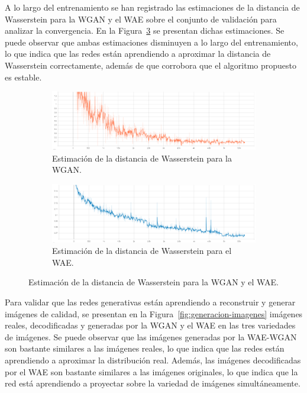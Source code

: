 A lo largo del entrenamiento se han registrado las estimaciones de la distancia de Wasserstein para la WGAN y el WAE sobre el conjunto de validación para analizar la convergencia. En la Figura~\ref{fig:wass-dist} se presentan dichas estimaciones. Se puede observar que ambas estimaciones disminuyen a lo largo del entrenamiento, lo que indica que las redes están aprendiendo a aproximar la distancia de Wasserstein correctamente, además de que corrobora que el algoritmo propuesto es estable.

\begin{figure}[H]
    \begin{subfigure}[b]{0.8\textwidth}
        \centering
        \includegraphics[width=\textwidth]{img/wgan-wae/wass-dist-wgan.png}
        \caption{Estimación de la distancia de Wasserstein para la WGAN.}
        \label{fig:wass-dist-wgan}
    \end{subfigure}
    \begin{subfigure}[b]{0.8\textwidth}
        \centering
        \includegraphics[width=\textwidth]{img/wgan-wae/wass-dist-wae.png}
        \caption{Estimación de la distancia de Wasserstein para el WAE.}
        \label{fig:wass-dist-wae}
    \end{subfigure}
    \caption{Estimación de la distancia de Wasserstein para la WGAN y el WAE.}
    \label{fig:wass-dist}
\end{figure}

Para validar que las redes generativas están aprendiendo a reconstruir y generar imágenes de calidad, se presentan en la Figura~\ref{fig:generacion-imagenes} imágenes reales, decodificadas y generadas por la WGAN y el WAE en las tres variedades de imágenes. Se puede observar que las imágenes generadas por la WAE-WGAN son bastante similares a las imágenes reales, lo que indica que las redes están aprendiendo a aproximar la distribución real. Además, las imágenes decodificadas por el WAE son bastante similares a las imágenes originales, lo que indica que la red está aprendiendo a proyectar sobre la variedad de imágenes simultáneamente.

